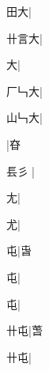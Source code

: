 \begin{multicols}{2}
{{\cjk{}{\cnsym{}　}田大}\mktsJzrVerticalBar{}{\cjk{}{\cnsym{}　}{\cnsym{}　}{\cnsym{}　}}|{}\par
{\cjk{}卄言大}\mktsJzrVerticalBar{}{\cjk{}{\cnsym{}　}{\cnsym{}　}{\cnsym{}　}}|{}\par
{大}\mktsJzrVerticalBar{}{\cjk{}{\cnsym{}　}{\cnsym{}　}{\cnsym{}　}}|{}\par
{\cjk{}厂{\cnxb{}𠃑}大}\mktsJzrVerticalBar{}{\cjk{}{\cnsym{}　}{\cnsym{}　}{\cnsym{}　}}|{}\par
{\cjk{}山{\cnxb{}𠃑}大}\mktsJzrVerticalBar{}{\cjk{}{\cnsym{}　}{\cnsym{}　}{\cnsym{}　}}|{}\par
{}\mktsJzrVerticalBar{}{\cjk{}{\cnsym{}　}{\cnsym{}　}{\cnsym{}　}}|{\cjk{}昚}\par
{\cjk{}镸彡{\cnxb{}𡗜}}\mktsJzrVerticalBar{}{\cjk{}{\cnsym{}　}{\cnsym{}　}{\cnsym{}　}}|{}\par
{\cjk{}{\cnsym{}　}{\cnsym{}　}尢}\mktsJzrVerticalBar{}{\cjk{}{\cnsym{}　}{\cnsym{}　}{\cnsym{}　}}|{}\par
{\cjk{}{\cnsym{}　}{\cnsym{}　}尤}\mktsJzrVerticalBar{}{\cjk{}{\cnsym{}　}{\cnsym{}　}{\cnsym{}　}}|{}\par
{\cjk{}{\cnsym{}　}{\cnsym{}　}屯}\mktsJzrVerticalBar{}{\cjk{}{\cnsym{}　}{\cnsym{}　}{\cnsym{}　}}|{\cjk{}旾}\par
{屯}\mktsJzrVerticalBar{}{\cjk{}{\cnsym{}　}{\cnsym{}　}{\cnsym{}　}}|{}\par
{屯}\mktsJzrVerticalBar{}{\cjk{}{\cnsym{}　}{\cnsym{}　}{\cnsym{}　}}|{}\par
{\cjk{}{\cnsym{}　}卄屯}\mktsJzrVerticalBar{}{\cjk{}{\cnsym{}　}{\cnsym{}　}{\cnsym{}　}}|{\cjk{}萅}\par
{卄屯}\mktsJzrVerticalBar{}{\cjk{}{\cnsym{}　}{\cnsym{}　}{\cnsym{}　}}|{}\par
}
\end{multicols}
